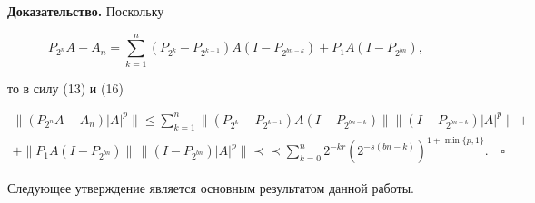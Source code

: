 {\bf Доказательство.} Поскольку


$$


P_{2^n}A - A_n =


\sum_{k=1}^n(P_{2^k}-P_{2^{k-1}})A(I-P_{2^{bn-k}}) +


P_1A(I-P_{2^{bn}}),


$$


то в силу (13) и (16)


\begin{multline*}


\|(P_{2^n}A - A_n)|A|^p\|  \le


\sum_{k=1}^n\|(P_{2^k}-P_{2^{k-1}})A(I-P_{2^{bn-k}})\|


\|(I-P_{2^{bn-k}})|A|^p\| + \\


+ \|P_1A(I-P_{2^{bn}})\|\,


\|(I-P_{2^{bn}})|A|^p\| \prec\prec


\sum_{k=0}^n2^{-kr}\left(2^{-s(bn-k)}\right)^{1+\min\{p,1\}}.


\quad\square


\end{multline*}


\medskip





Следующее утверждение является основным результатом данной работы.





